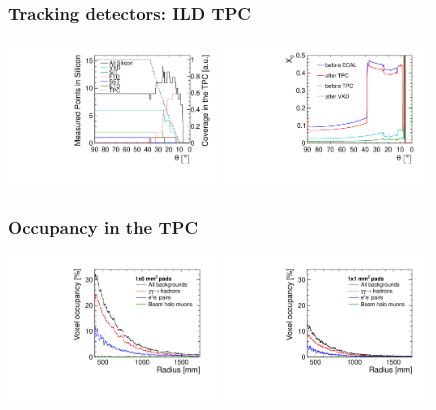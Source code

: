 \documentclass{beamer}
\begin{document}
\begin{frame}
\frametitle{Tracking detectors: ILD TPC}
\includegraphics[width=5.5cm]{AngularCoverageCLIC_ILD.pdf}
\includegraphics[width=5.5cm]{CLIC_ILD_X0.pdf}
\end{frame}
\begin{frame}
\frametitle{Occupancy in the TPC}
\includegraphics[width=5.5cm]{TPCoccupancies.pdf}
\includegraphics[width=5.5cm]{TPCoccupancies_1mmPads.pdf}
\end{frame}
\end{document}
